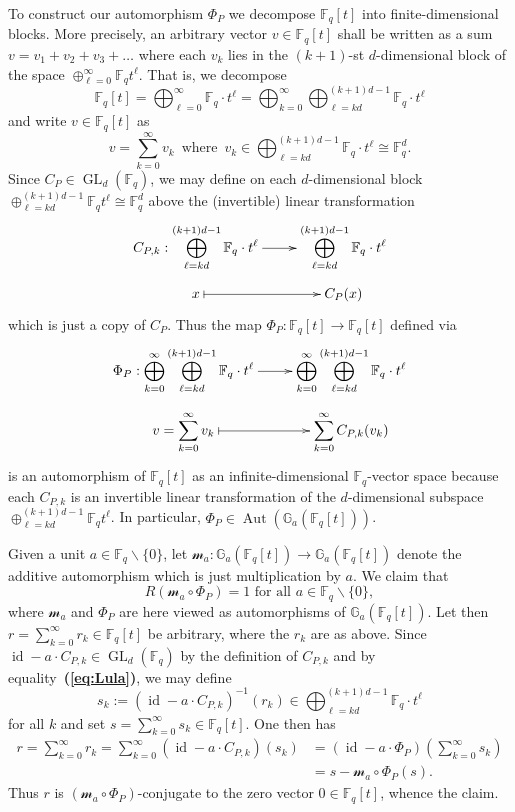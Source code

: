\documentclass[a4paper,11pt]{amsart}
\numberwithin{equation}{section}
\theoremstyle{plain}
\theoremstyle{definition}
\newcommand{\F}{\mathbb{F}}
\DeclareMathOperator{\GL}{GL} %
\newcommand{\Addi}{\mathbb{G}_{a}} %
\newcommand{\set}[1]{\{ #1 \}}
\newcommand{\mc}{\mathcal}
\newcommand{\bref}[1]{{\bf(\ref{#1})}} %
\DeclareMathOperator{\Aut}{Aut}
\DeclareMathOperator{\id}{id}
\begin{document}
To construct our automorphism $\Phi_P$ we decompose $\F_q[t]$ into finite-dimensional blocks. More precisely, an arbitrary vector $v \in \F_q[t]$ shall be written as a sum $v = v_1+v_2+v_3+\ldots$ where each $v_k$ lies in the $(k+1)$-st $d$-dimensional block of the space $\oplus_{\ell=0}^\infty \F_q t^\ell$. That is, we decompose 
\[ \F_q[t] = \bigoplus_{\ell=0}^\infty \F_q \cdot t^\ell = \bigoplus_{k=0}^\infty \bigoplus_{\ell=kd}^{(k+1)d-1} \F_q \cdot t^\ell \]
and write $v \in \F_q[t]$ as
\[ v = \sum_{k=0}^\infty v_k \, \text{ where } \, v_k \in \bigoplus_{\ell=kd}^{(k+1)d-1} \F_q \cdot t^\ell \cong \F_q^d. \]
Since $C_P \in \GL_d(\F_q)$, we may define on each $d$-dimensional block $\oplus_{\ell=kd}^{(k+1)d-1} \F_q t^\ell \cong \F_q^d$ above the (invertible) linear transformation 
\[ \xymatrix@R=2mm{ 
\displaystyle C_{P,k} : \bigoplus_{\ell=kd}^{(k+1)d-1} \F_q \cdot t^\ell \ar[r] & \displaystyle\bigoplus_{\ell=kd}^{(k+1)d-1} \F_q \cdot t^\ell \\
x \ar@{|->}[r] & C_P(x)
}
 \]
which is just a copy of $C_P$. Thus the map $\Phi_P : \F_q[t] \to \F_q[t]$ defined via 
\[ 
\xymatrix@R=2mm{ 
\Phi_P : \displaystyle\bigoplus_{k=0}^\infty \bigoplus_{\ell=kd}^{(k+1)d-1} \F_q \cdot t^\ell \ar[r] & \displaystyle \bigoplus_{k=0}^\infty \bigoplus_{\ell=kd}^{(k+1)d-1} \F_q \cdot t^\ell \\
v = \displaystyle\sum_{k=0}^\infty v_k \ar@{|->}[r] & \displaystyle\sum_{k=0}^\infty C_{P,k}(v_k)
} 
\]
is an automorphism of $\F_q[t]$ as an infinite-dimensional $\F_q$-vector space because each $C_{P,k}$ is an invertible linear transformation of the $d$-dimensional subspace $\oplus_{\ell=kd}^{(k+1)d-1} \F_q t^\ell$. In particular, $\Phi_P \in \Aut(\Addi(\F_q[t]))$.

Given a unit $a \in \F_q \backslash \set{0}$, let $\mc{m}_a : \Addi(\F_q[t]) \to \Addi(\F_q[t])$ denote the additive automorphism which is just multiplication by $a$. We claim that 
\begin{equation} \label{eq:R(maPhi)}
R(\mc{m}_a \circ \Phi_P) = 1 \text{ for all } a \in \F_q \backslash \set{0},
\end{equation} 
where $\mc{m}_a$ and $\Phi_P$ are here viewed as automorphisms of $\Addi(\F_q[t])$. Let then $r = \sum_{k=0}^\infty r_k \in \F_q[t]$ be arbitrary, where the $r_k$ are as above. Since $\id-a\cdot C_{P,k} \in \GL_d(\F_q)$ by the definition of $C_{P,k}$ and by equality~\bref{eq:Lula}, we may define 
\[ s_k := (\id-a\cdot C_{P,k})^{-1}(r_k) \in \bigoplus_{\ell=kd}^{(k+1)d-1} \F_q \cdot t^\ell \]
for all $k$ and set $s = \sum_{k=0}^\infty s_k \in \F_q[t]$. One then has
\begin{align*} 
r = \sum_{k=0}^\infty r_k = \sum_{k=0}^\infty (\id-a\cdot C_{P,k})(s_k) & = (\id-a\cdot\Phi_P)\left(\sum_{k=0}^\infty s_k\right) \\ & = s - \mc{m}_a \circ \Phi_P(s).
\end{align*}
Thus $r$ is $(\mc{m}_a\circ\Phi_P)$-conjugate to the zero vector $0 \in \F_q[t]$, whence the claim.
\end{document}
